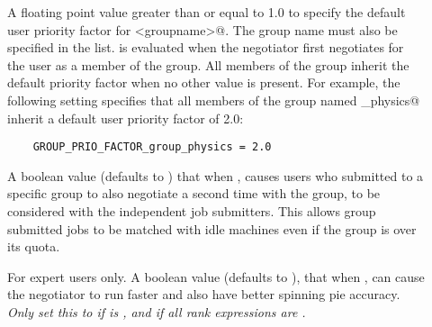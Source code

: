 \begin{description}

\item[] \label{param:GroupPrioFactorGroupname}
  A floating point value greater than or equal to 1.0 to specify the
  default user priority factor for \verb@<groupname>@. 
  The group name must also be specified in the  list.
   is evaluated when
  the negotiator first negotiates for the user as a member of the group.
  All members of the group inherit the default priority factor
  when no other value is present.
  For example, the following setting
  specifies that all members of the group named \verb@group_physics@
  inherit a default user priority factor of 2.0:
  \begin{verbatim}
    GROUP_PRIO_FACTOR_group_physics = 2.0
  \end{verbatim}

\item[] \label{param:GroupAutoregroup}
  A boolean value (defaults to ) that when ,
  causes users who submitted to a specific group to
  also negotiate a second time with the \verb@none@ group,
  to be considered with the independent job submitters. 
  This allows group submitted jobs to be matched with idle machines
  even if the group is over its quota.

\item[] \label{param:NegotiatorConsiderPreemption}
  For expert users only. A boolean value (defaults to ),
  that when ,
  can cause the negotiator to run
  faster and also have better spinning pie accuracy.
  \emph{Only set this to  if 
  is ,
  and if all  rank expressions are .}

\end{description}

